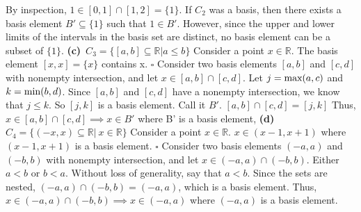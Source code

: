 \documentclass[12pt]{article}
\begin{document}
	By inspection, \(1 \in [0,1] \cap [1,2] = \{1\}\). \newline
	If \(C_2\) was a basis, then there exists a basis element \(B' \subseteq \{1\}\) such that \(1 \in B'\). \newline
	However, since the upper and lower limits of the intervals in the basis set are distinct, no basis element can be a subset of \(\{1\}\). \newline
	\newline
	\textbf{(c)}\ \(C_3 = \{[a,b] \subseteq \mathbb{R}| a \leq b\}\)
	\newline
	Consider a point \(x \in \mathbb{R}\). \newline
	The basis element \([x,x] = \{x\}\) contains x.
	\newline \(\square\) \newline
	Consider two basis elements \([a,b]\) and \([c,d]\) with nonempty intersection, and let \(x \in [a,b] \cap [c,d]\).
	\newline
	Let \(j = \textup{max}(a,c)\) and \(k = \textup{min}(b,d)\).
	\newline
	Since \([a,b]\) and \([c,d]\) have a nonempty intersection, we know that \(j \leq k\). \newline
	So \([j,k]\) is a basis element. Call it \(B'\).
	\newline
	\([a,b] \cap [c,d] = [j,k]\)
	\newline
	Thus, \(x \in [a,b] \cap [c,d] \implies x \in B'\) where B' is a basis element,
	\newline
	\newline
	\textbf{(d)}\ \(C_4 = \{(-x,x)\subseteq \mathbb{R}|\ x \in \mathbb{R}\}\) \newline
	Consider a point \(x \in \mathbb{R}\). \newline
	\(x \in (x-1, x+1)\) where \((x-1, x+1)\) is a basis element.
	\newline \(\square\) \newline
	Consider two basis elements \((-a,a)\) and \((-b,b)\) with nonempty intersection, and let \(x \in (-a, a) \cap (-b, b)\).
	\newline
	Either \(a<b\) or \(b<a\). Without loss of generality, say that \(a<b\). \newline
	Since the sets are nested, \((-a,a) \cap (-b,b) = (-a,a)\), which is a basis element. \newline
	Thus, \(x \in (-a,a) \cap (-b,b) \implies x \in (-a,a)\) where \((-a,a)\) is a basis element.
\end{document}
